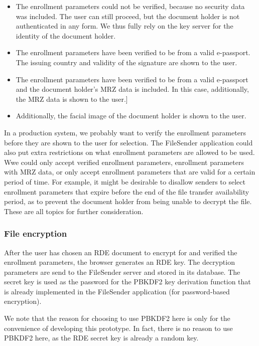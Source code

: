 \begin{itemize}
    \item The enrollment parameters could not be verified, because no security data was included.
    The user can still proceed, but the document holder is not authenticated in any form.
    We thus fully rely on the key server for the identity of the document holder.
    \item The enrollment parameters have been verified to be from a valid e-passport.
    The issuing country and validity of the signature are shown to the user.
    \item The enrollment parameters have been verified to be from a valid e-passport and the document holder's MRZ data is included.
    In this case, additionally, the MRZ data is shown to the user.]
    \item Additionally, the facial image of the document holder is shown to the user.
\end{itemize}

In a production system, we probably want to verify the enrollment parameters before they are shown to the user for selection.
The FileSender application could also put extra restrictions on what enrollment parameters are allowed to be used.
Wwe could only accept verified enrollment parameters, enrollment parameters with MRZ data, or only accept enrollment parameters that are valid for a certain period of time.
For example, it might be desirable to disallow senders to select enrollment parameters that expire before the end of the file transfer availability period, as to prevent the document holder from being unable to decrypt the file.
These are all topics for further consideration.

\subsubsection{File encryption}
After the user has chosen an RDE document to encrypt for and verified the enrollment parameters, the browser generates an RDE key.
The decryption parameters are send to the FileSender server and stored in its database.
The secret key is used as the password for the PBKDF2 key derivation function that is already implemented in the FileSender application (for password-based encryption).

We note that the reason for choosing to use PBKDF2 here is only for the convenience of developing this prototype.
In fact, there is no reason to use PBKDF2 here, as the RDE secret key is already a random key.

